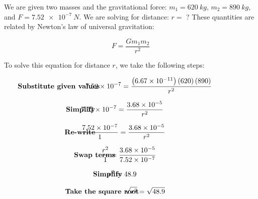 \documentclass[main-physics.tex]{subfiles}
\begin{document}
\Solution We are given two masses and the gravitational force: $m_1 = \SI{620}{kg}$, $m_2 = \SI{890}{kg}$, and $F = \SI{7.52e-7}{N}$. We are solving for distance: $r=$ ? These quantities are related by Newton's law of universal gravitation:

\begin{equation*}
    F = \frac{G m_1 m_2}{r^2}
\end{equation*}

To solve this equation for distance $r$, we take the following steps:

\begin{align*}
    \hspace{-3.5em} & \textbf{Substitute given values} & \hspace{-3em} &
    \SI{7.52e-7}{} = \frac{
        \left(\SI{6.67e-11}{}\right)
        \left(620\right)
        \left(890\right)
    }{r^2}
\end{align*}

\begin{align*}
    \hspace{-3.5em} & \textbf{Simplify} & \hspace{-3em} &
    \SI{7.52e-7}{} = \frac{\SI{3.68e-5}{}}{r^2}
\end{align*}

\begin{align*}
    \hspace{-3.5em} & \textbf{Re-write} & \hspace{-3em} &
    \frac{\SI{7.52e-7}{}}{1} = \frac{\SI{3.68e-5}{}}{r^2}
\end{align*}

\begin{align*}
    \hspace{-3.5em} & \textbf{Swap terms} & \hspace{-3em} &
    \frac{r^2}{1} = \frac{\SI{3.68e-5}{}}{\SI{7.52e-7}{}}
\end{align*}


\begin{align*}
    \hspace{-3.5em} & \textbf{Simplify} & \hspace{-3em} &
    r^2 = 48.9
\end{align*}

\begin{align*}
    \hspace{-3.5em} & \textbf{Take the square root} & \hspace{-3em} &
    \sqrt{r^2} = \sqrt{48.9}
\end{align*}
\end{document}

